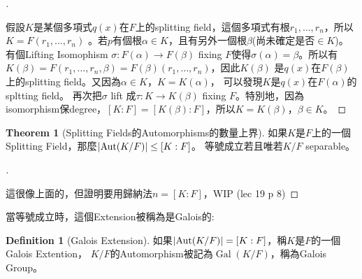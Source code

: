 \documentclass[12pt]{article}
\theoremstyle{definition}
\newtheorem{thm}{Theorem}
\newtheorem{dfn}{Definition}
\newenvironment{proofs}[1][\proofname]{%
  \begin{proof}[#1]$ $\par\nobreak\ignorespaces
}{%
  \end{proof}
}
\DeclareMathOperator{\Aut}{Aut}
\DeclareMathOperator{\Gal}{Gal}
\begin{document}
\begin{proofs}
	假設$K$是某個多項式$q(x)$在$F$上的splitting field，這個多項式有根$r_1,\ldots,r_n$，所以$K=F(r_1,\ldots, r_n)$
	。若$p$有個根$\alpha\in K$，且有另外一個根$\beta$(尚未確定是否$\in K$)。有個Lifting Isomophism
	$\sigma:F(\alpha)\to F(\beta)$ fixing $F$使得$\sigma(\alpha)=\beta$。所以有$K(\beta)
		=F(r_1,\ldots,r_n,\beta)=F(\beta)(r_1,\ldots,r_n)$，因此$K(\beta)$
	是$q(x)$在$F(\beta)$上的splitting field。又因為$\alpha\in K$，$K=K(\alpha)$，
	可以發現$K$是$q(x)$在$F(\alpha)$的spltting field。
	再次把$\sigma$ lift 成$\tau: K\to K(\beta)$ fixing $F$。特別地，因為isomorphism保degree，$[K:F]=[K(\beta):F]$，所以$K=K(\beta)$，$\beta\in K$。
\end{proofs}

\begin{thm}[Splitting Fields的Automorphisms的數量上界]
	如果$K$是$F$上的一個Splitting Field，那麼$\abs{\Aut(K/F)} \le [K:F]$。
	等號成立若且唯若$K/F$ separable。
\end{thm}

\begin{proofs}
	這很像上面的，但證明要用歸納法$n=[K:F]$，WIP (lec 19 p 8)
\end{proofs}

當等號成立時，這個Extension被稱為是Galois的:
\begin{dfn}[Galois Extension]
	如果$\abs{\Aut(K/F)} = [K:F]$，稱$K$是$F$的一個Galois Extention，
	$K/F$的Automorphism被記為$\Gal(K/F)$，稱為Galois Group。
\end{dfn}
\end{document}
